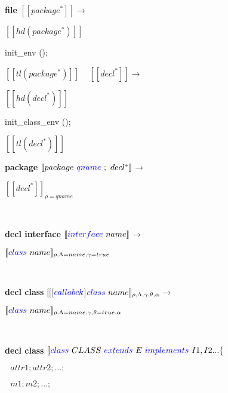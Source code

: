 \documentclass[a4paper, 11pt, notitlepage]{article}
\begin{document}
\begin{multicols}{2}
\textbf{file}
\newline
\noindent
$[\![ package^* ]\!]$$\longrightarrow$

$[\![ hd(package^*) ]\!]$
\begin{OCaml}
   init_env ();
\end{OCaml} 

$[\![ tl(package^*) ]\!]$ 
\newline
\ 
\newline
\noindent
$[\![ decl^* ]\!]$$\longrightarrow$

$[\![ hd(decl^*) ]\!]$
\begin{OCaml}
   init_class_env ();
\end{OCaml} 

$[\![ tl(decl^*) ]\!]$ 
\newline
\ 
\newline

\textbf{package}
\newline
\noindent
$[\![ package\ {\color{blue}qname}\ ;\ decl^* ]\!]$$\longrightarrow$

$[\![ decl^* ]\!]_{\rho=qname}$ 

\ 
\newline

\textbf{ decl interface }
\newline
\noindent
$[\![{\color{blue}interface}\  name ]\!]$$\longrightarrow$

$[\![{\color{blue}class}\  name ]\!]_{\rho,\Lambda=name,\gamma=true}$

\ 
\newline

\textbf{ decl class }
\newline
\noindent
$[\![$[$ {\color{blue}callabck}$]${\color{blue} class}\  name ]\!]_{\rho,\Lambda,\gamma,\theta,\alpha}$$\longrightarrow$

$[\![{\color{blue}class}\  name ]\!]_{\rho,\Lambda=name,\gamma,\theta=true,\alpha}$
\end{multicols}

\ 
\newpage
\noindent

\textbf{ decl class}
\newline
\noindent
$[\![ {\color{blue}class}\ CLASS\ 
 {\color{blue}extends}\  E \ 
 {\color{blue}implements}\  I1,I2... \{$

 $ \ \ \ attr1; attr2; ...;$

  $\ \ \ m1; m2; ...;$
\end{document}
